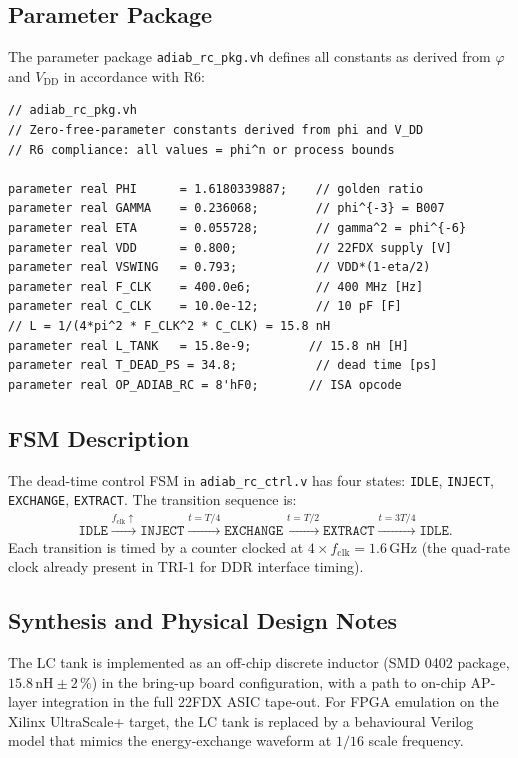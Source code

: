 \subsection{Parameter Package}

The parameter package \texttt{adiab\_rc\_pkg.vh} defines all constants as
derived from $\varphi$ and $V_{\mathrm{DD}}$ in accordance with R6:

\begin{verbatim}
// adiab_rc_pkg.vh
// Zero-free-parameter constants derived from phi and V_DD
// R6 compliance: all values = phi^n or process bounds

parameter real PHI      = 1.6180339887;    // golden ratio
parameter real GAMMA    = 0.236068;        // phi^{-3} = B007
parameter real ETA      = 0.055728;        // gamma^2 = phi^{-6}
parameter real VDD      = 0.800;           // 22FDX supply [V]
parameter real VSWING   = 0.793;           // VDD*(1-eta/2)
parameter real F_CLK    = 400.0e6;         // 400 MHz [Hz]
parameter real C_CLK    = 10.0e-12;        // 10 pF [F]
// L = 1/(4*pi^2 * F_CLK^2 * C_CLK) = 15.8 nH
parameter real L_TANK   = 15.8e-9;        // 15.8 nH [H]
parameter real T_DEAD_PS = 34.8;           // dead time [ps]
parameter real OP_ADIAB_RC = 8'hF0;       // ISA opcode
\end{verbatim}

\subsection{FSM Description}

The dead-time control FSM in \texttt{adiab\_rc\_ctrl.v} has four states:
\texttt{IDLE}, \texttt{INJECT}, \texttt{EXCHANGE}, \texttt{EXTRACT}.
The transition sequence is:
\begin{align}
  &\texttt{IDLE} \xrightarrow{f_{\mathrm{clk}} \uparrow} \texttt{INJECT}
    \xrightarrow{t = T/4} \texttt{EXCHANGE}
    \xrightarrow{t = T/2} \texttt{EXTRACT}
    \xrightarrow{t = 3T/4} \texttt{IDLE}.
\end{align}
Each transition is timed by a counter clocked at $4 \times f_{\mathrm{clk}} = 1.6\,\text{GHz}$
(the quad-rate clock already present in TRI-1 for DDR interface timing).

\subsection{Synthesis and Physical Design Notes}

The LC tank is implemented as an off-chip discrete inductor (SMD 0402 package,
$15.8\,\text{nH} \pm 2\,\%$) in the bring-up board configuration, with a path
to on-chip AP-layer integration in the full 22FDX ASIC tape-out.
For FPGA emulation on the Xilinx UltraScale+ target, the LC tank is replaced
by a behavioural Verilog model that mimics the energy-exchange waveform at
$1/16$ scale frequency.

